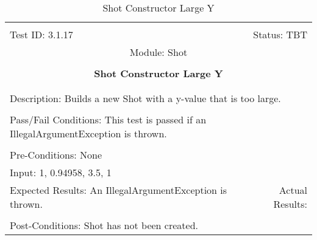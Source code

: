 \documentclass[titlepage]{article}
\begin{document}
\begin{center}%
\begin{table}
\begin{tabular}{|l r|}\hline&\\[-2mm]
	Test ID: 3.1.17	&Status: TBT\\[-3mm]
	\multicolumn{2}{|c|}{Module: Shot}\\&\\
	\multicolumn{2}{|c|}{\textbf{\large{Shot Constructor Large Y}}}\\&\\\hline&\\[-3mm]
	\multicolumn{2}{|p{\textwidth}|}{Description: Builds a new Shot with a y-value that is too large.}\\[1mm]\hline&\\[-3mm]
	\multicolumn{2}{|p{\textwidth}|}{Pass/Fail Conditions: This test is passed if an IllegalArgumentException is thrown.}\\[1mm]\hline&\\[-3mm]
	\multicolumn{2}{|p{\textwidth}|}{Pre-Conditions: None}\\[4mm]
	\multicolumn{2}{|p{\textwidth}|}{Input: 1, 0.94958, 3.5, 1}\\[2mm]\hline
	\multicolumn{1}{|p{0.49\textwidth}}{Expected Results: An IllegalArgumentException is thrown.}	&\multicolumn{1}{|p{0.45\textwidth}|}{Actual Results: }\\\hline&\\[-3mm]
	\multicolumn{2}{|p{\textwidth}|}{Post-Conditions: Shot has not been created.}\\\hline
\end{tabular}
\caption{Shot Constructor Large Y}
\end{table}
\end{center}
\end{document}
